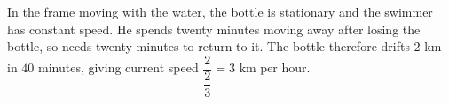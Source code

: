 In the frame moving with the water, the bottle is stationary and the swimmer has constant speed. He spends twenty minutes moving away after losing the bottle, so needs twenty minutes to return to it. The bottle therefore drifts $2$ km in $40$ minutes, giving current speed $\dfrac{2}{\dfrac{2}{3}}=\boxed{3\text{ km per hour}}$.
